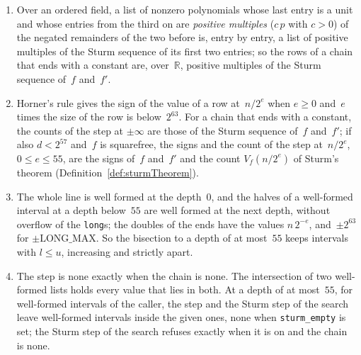 \begin{lemma}\label{lem:sturmStep}
  \leanok
  \begin{enumerate}
    \item Over an ordered field, a list of nonzero polynomials whose last entry is a unit and whose
      entries from the third on are \emph{positive multiples} ($c\,p$ with $c > 0$) of the negated
      remainders of the two before is, entry by entry, a list of positive multiples of the Sturm
      sequence of its first two entries; so the rows of a chain that ends with a constant are,
      over~$\mathbb{R}$, positive multiples of the Sturm sequence of~$f$ and~$f'$.
    \item Horner's rule gives the sign of the value of a row at~$n/2^e$ when $e \ge 0$ and~$e$
      times the size of the row is below~$2^{63}$. For a chain that ends with a constant, the
      counts of the step at $\pm\infty$ are those of the Sturm sequence of~$f$ and~$f'$; if also
      $d < 2^{57}$ and~$f$ is squarefree, the signs and the count of the step at~$n/2^e$,
      $0 \le e \le 55$, are the signs of~$f$ and~$f'$ and the count $V_f(n/2^e)$ of Sturm's
      theorem (Definition~\ref{def:sturmTheorem}).
    \item The whole line is well formed at the depth~$0$, and the halves of a well-formed interval
      at a depth below~$55$ are well formed at the next depth, without overflow of the \verb|long|s;
      the doubles of the ends have the values $n\,2^{-e}$, and~$\pm 2^{63}$ for
      $\pm\mathrm{LONG\_MAX}$. So the bisection to a depth of at most~$55$ keeps intervals with
      $l \le u$, increasing and strictly apart.
    \item The step is none exactly when the chain is none. The intersection of two well-formed
      lists holds every value that lies in both. At a depth of at most~$55$, for well-formed
      intervals of the caller, the step and the Sturm step of the search leave well-formed
      intervals inside the given ones, none when \verb|sturm_empty| is set; the Sturm step of the
      search refuses exactly when it is on and the chain is none.
  \end{enumerate}
\end{lemma}

